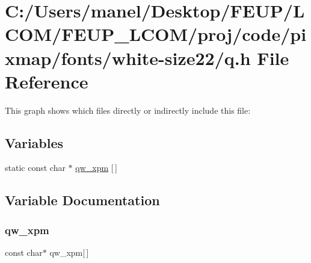 \hypertarget{white-size22_2q_8h}{}\section{C\+:/\+Users/manel/\+Desktop/\+F\+E\+U\+P/\+L\+C\+O\+M/\+F\+E\+U\+P\+\_\+\+L\+C\+O\+M/proj/code/pixmap/fonts/white-\/size22/q.h File Reference}
\label{white-size22_2q_8h}
This graph shows which files directly or indirectly include this file\+:
\subsection*{Variables}
\begin{DoxyCompactItemize}
\item 
static const char $\ast$ \mbox{\hyperlink{white-size22_2q_8h_ada31866b49de6960f7d6a2f4db3acc2e}{qw\+\_\+xpm}} \mbox{[}$\,$\mbox{]}
\end{DoxyCompactItemize}


\subsection{Variable Documentation}
\mbox{\label{white-size22_2q_8h_ada31866b49de6960f7d6a2f4db3acc2e}} 
\subsubsection{\texorpdfstring{qw\_xpm}{qw\_xpm}}
{\footnotesize\ttfamily const char$\ast$ qw\+\_\+xpm\mbox{[}$\,$\mbox{]}\hspace{0.3cm}{\ttfamily [static]}}

